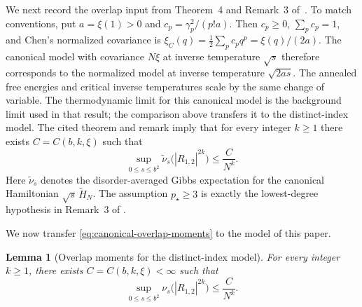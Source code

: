 \documentclass[letterpaper,11pt,reqno]{amsart}
\newtheorem{lem}[thm]{Lemma}
\renewcommand{\leq}{\leqslant}
\renewcommand{\geq}{\geqslant}
\begin{document}
We next record the overlap input from Theorem~4 and Remark~3 of~\cite{ChenHighTemperature}. To match conventions, put $a=\xi(1)>0$ and $c_p=\gamma_p^2/(p!a)$. Then $c_p\geq0$, $\sum_pc_p=1$, and Chen's normalized covariance is $\xi_C(q)=\tfrac12\sum_pc_pq^p=\xi(q)/(2a)$. The canonical model with covariance $N\xi$ at inverse temperature $\sqrt{s}$ therefore corresponds to the normalized model at inverse temperature $\sqrt{2as}$. The annealed free energies and critical inverse temperatures scale by the same change of variable. The thermodynamic limit for this canonical model is the background limit used in that result; the comparison above transfers it to the distinct-index model. The cited theorem and remark imply that for every integer
$k\geq1$ there exists $C=C(b,k,\xi)$ such that
\begin{equation}
\sup_{0\leq s\leq b^2}
\widetilde\nu_s\bigl(|R_{1,2}|^{2k}\bigr)
\leq
\frac{C}{N^k}.
\label{eq:canonical-overlap-moments}
\end{equation}
Here $\widetilde\nu_s$ denotes the disorder-averaged Gibbs expectation
for the canonical Hamiltonian $\sqrt{s}\,\widetilde H_N$. The
assumption $p_\star\geq3$ is exactly the lowest-degree hypothesis in
Remark~3 of \cite{ChenHighTemperature}.

We now transfer \eqref{eq:canonical-overlap-moments} to the
model of this paper.

\begin{lem}[Overlap moments for the distinct-index model]
\label{lem:distinct-overlap-moments}
For every integer $k\geq1$, there exists
$C=C(b,k,\xi)<\infty$ such that
\begin{equation}
\sup_{0\leq s\leq b^2}
\nu_s\bigl(|R_{1,2}|^{2k}\bigr)
\leq
\frac{C}{N^k}.
\label{eq:distinct-overlap-moments}
\end{equation}
\end{lem}
\end{document}
